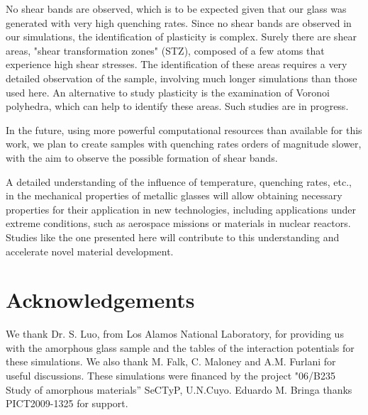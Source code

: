 No shear bands are observed, which is to be expected given that our glass was generated with very high quenching rates. Since no shear bands are observed in our simulations, the identification of plasticity is complex. Surely there are shear areas, "shear transformation zones" (STZ), composed of a few atoms that experience high shear stresses. The identification of these areas requires a very detailed observation of the sample, involving much longer simulations than those used here. An alternative to study plasticity is the examination of Voronoi polyhedra, which can help to identify these areas. Such studies are in progress.

In the future, using more powerful computational resources than available for this work, we plan to create samples with quenching rates orders of magnitude slower, with the aim to observe the possible formation of shear bands.

A detailed understanding of the influence of temperature, quenching rates, etc., in the mechanical properties of metallic glasses will allow obtaining necessary properties for their application in new technologies, including applications under extreme conditions, such as aerospace missions or materials in nuclear reactors. Studies like the one presented here will contribute to this understanding and accelerate novel material development. 

\section{Acknowledgements}
We thank Dr. S. Luo, from Los Alamos National Laboratory, for providing us with the amorphous glass sample and the tables of the interaction potentials for these simulations. We also thank M. Falk, C. Maloney and A.M. Furlani for useful discussions. These simulations were financed by the project "06/B235 Study of amorphous materials” SeCTyP, U.N.Cuyo. Eduardo M. Bringa thanks PICT2009-1325 for support.